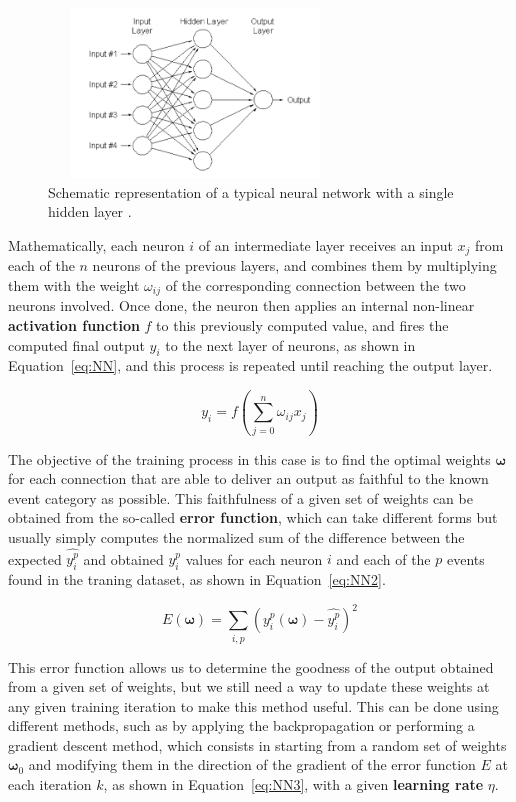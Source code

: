 \documentclass[a4paper, 10pt, openright]{report}
\begin{document}
\begin{figure}[htbp]
\centering
\includegraphics[width=7.8cm, height=4.5cm]{figs/NN.png}
\caption{Schematic representation of a typical neural network with a single hidden layer \cite{NN}.}
\label{fig:NN}
\end{figure}

Mathematically, each neuron $i$ of an intermediate layer receives an input $x_{j}$ from each of the $n$ neurons of the previous layers, and combines them by multiplying them with the weight $\omega_{ij}$ of the corresponding connection between the two neurons involved. Once done, the neuron then applies an internal non-linear \textbf{activation function} $f$ to this previously computed value, and fires the computed final output $y_i$ to the next layer of neurons, as shown in Equation~\ref{eq:NN}, and this process is repeated until reaching the output layer.

\begin{equation}
\label{eq:NN}
y_i = f \left (\sum_{j = 0}^n \omega_{ij} x_j \right)
\end{equation}

The objective of the training process in this case is to find the optimal weights $\bm \omega$ for each connection that are able to deliver an output as faithful to the known event category as possible. This faithfulness of a given set of weights can be obtained from the so-called \textbf{error function}, which can take different forms but usually simply computes the normalized sum of the difference between the expected $\hat{y_i^p}$ and obtained $y_i^p$ values for each neuron $i$ and each of the $p$ events found in the traning dataset, as shown in Equation~\ref{eq:NN2}.

\begin{equation}
\label{eq:NN2}
E(\bm \omega) = \sum_{i, p} \left (y_i^p(\bm \omega) - \hat{y_i^p} \right)^2
\end{equation}

This error function allows us to determine the goodness of the output obtained from a given set of weights, but we still need a way to update these weights at any given training iteration to make this method useful. This can be done using different methods, such as by applying the backpropagation or performing a gradient descent method, which consists in starting from a random set of weights $\bm \omega_0$ and modifying them in the direction of the gradient of the error function $E$ at each iteration $k$, as shown in Equation~\ref{eq:NN3}, with a given \textbf{learning rate} $\eta$.
\end{document}

